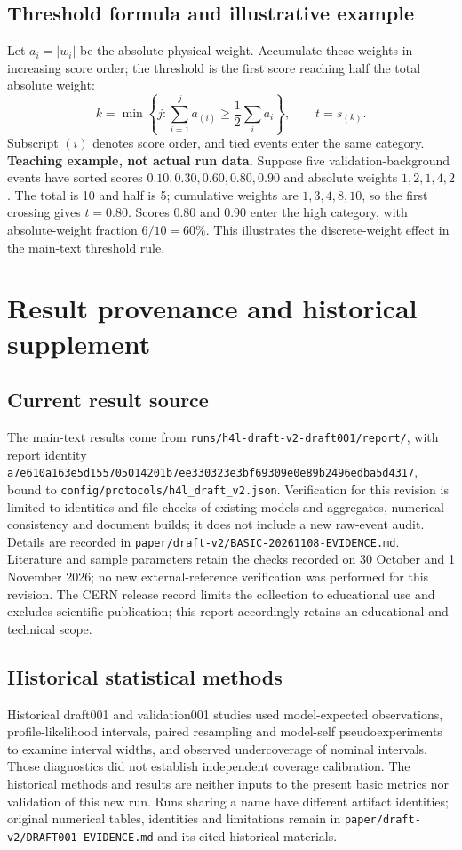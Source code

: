 \documentclass[11pt,a4paper]{article}
\begin{document}
\subsection{Threshold formula and illustrative example}\label{app:threshold}
Let $a_i=|w_i|$ be the absolute physical weight.
Accumulate these weights in increasing score order; the threshold is the first score reaching half the total absolute weight:
\[
 k=\min\left\{j:\sum_{i=1}^{j}a_{(i)}\geq\frac12\sum_i a_i\right\},
 \qquad t=s_{(k)}.
\]
Subscript $(i)$ denotes score order, and tied events enter the same category.
\textbf{Teaching example, not actual run data.}
Suppose five validation-background events have sorted scores $0.10,0.30,0.60,0.80,0.90$ and absolute weights $1,2,1,4,2$.
The total is 10 and half is 5; cumulative weights are $1,3,4,8,10$, so the first crossing gives $t=0.80$.
Scores 0.80 and 0.90 enter the high category, with absolute-weight fraction $6/10=60\%$.
This illustrates the discrete-weight effect in the main-text threshold rule.
\FloatBarrier

\section{Result provenance and historical supplement}\label{app:provenance}

\subsection{Current result source}
The main-text results come from \nolinkurl{runs/h4l-draft-v2-draft001/report/}, with report identity
\nolinkurl{a7e610a163e5d155705014201b7ee330323e3bf69309e0e89b2496edba5d4317},
bound to \nolinkurl{config/protocols/h4l_draft_v2.json}.
Verification for this revision is limited to identities and file checks of existing models and aggregates, numerical consistency and document builds; it does not include a new raw-event audit.
Details are recorded in \nolinkurl{paper/draft-v2/BASIC-20261108-EVIDENCE.md}.
Literature and sample parameters retain the checks recorded on 30 October and 1 November 2026; no new external-reference verification was performed for this revision.
The CERN release record limits the collection to educational use and excludes scientific publication; this report accordingly retains an educational and technical scope.

\subsection{Historical statistical methods}\label{app:interval}
Historical draft001 and validation001 studies used model-expected observations, profile-likelihood intervals, paired resampling and model-self pseudoexperiments to examine interval widths, and observed undercoverage of nominal intervals.
Those diagnostics did not establish independent coverage calibration.
The historical methods and results are neither inputs to the present basic metrics nor validation of this new run.
Runs sharing a name have different artifact identities; original numerical tables, identities and limitations remain in \nolinkurl{paper/draft-v2/DRAFT001-EVIDENCE.md} and its cited historical materials.
\end{document}
